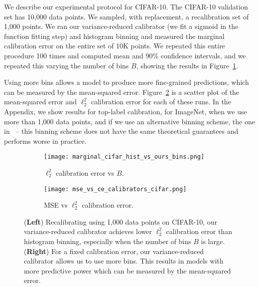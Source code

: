 We describe our experimental protocol for CIFAR-10.
The CIFAR-10 validation set has 10,000 data points. We sampled, with replacement, a recalibration set of 1,000 points. We ran our variance-reduced calibrator (we fit a sigmoid in the function fitting step) and histogram binning and measured the marginal calibration error on the entire set of 10K points.
We repeated this entire procedure 100 times and computed mean and 90\% confidence intervals, and we repeated this varying the number of bins $B$, showing the results in Figure~\ref{fig:marginal_calibrator_comparison_cifar}.

Using more bins allows a model to produce more fine-grained predictions, which can be measured by the mean-squared error. Figure~\ref{fig:cifar_calibrator_cmp_mse_ce} is a scatter plot of the mean-squared error and $\ell_2^2$ calibration error for each of these runs. In the Appendix, we show results for top-label calibration, for ImageNet, when we use more than 1,000 data points, and if we use an alternative binning scheme, the one in~\cite{guo2017calibration} -- this binning scheme does not have the same theoretical guarantees and performs worse in practice.

\begin{figure}
  \centering
  \centering
     \begin{subfigure}[b]{0.55\textwidth}
         \centering
         \texttt{[image: marginal\_cifar\_hist\_vs\_ours\_bins.png]}
         \caption{$\ell_2^2$ calibration error vs $B$.}
         \label{fig:marginal_calibrator_comparison_cifar}
     \end{subfigure}
     \hfill
     \begin{subfigure}[b]{0.4\textwidth}
         \centering
         \texttt{[image: mse\_vs\_ce\_calibrators\_cifar.png]}
         \caption{MSE vs $\ell_2^2$ calibration error.}
         \label{fig:cifar_calibrator_cmp_mse_ce}
     \end{subfigure}
  \caption{
  (\textbf{Left}) Recalibrating using 1,000 data points on CIFAR-10, our variance-reduced calibrator achieves lower $\ell_2^2$ calibration error than histogram binning, especially when the number of bins $B$ is large.
  (\textbf{Right}) For a fixed calibration error, our variance-reduced calibrator allows us to use more bins. This results in models with more predictive power which can be measured by the mean-squared error.
  }
  \label{fig:nan2}
\end{figure}

